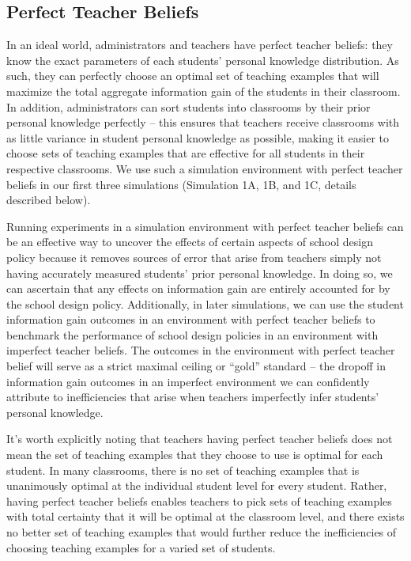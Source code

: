\documentclass[10pt, letterpaper]{apa6}
\begin{document}
\subsection{Perfect Teacher Beliefs}\label{perfect-teacher-beliefs}

In an ideal world, administrators and teachers have perfect teacher
beliefs: they know the exact parameters of each students' personal
knowledge distribution. As such, they can perfectly choose an optimal
set of teaching examples that will maximize the total aggregate
information gain of the students in their classroom. In addition,
administrators can sort students into classrooms by their prior personal
knowledge perfectly -- this ensures that teachers receive classrooms
with as little variance in student personal knowledge as possible,
making it easier to choose sets of teaching examples that are effective
for all students in their respective classrooms. We use such a
simulation environment with perfect teacher beliefs in our first three
simulations (Simulation 1A, 1B, and 1C, details described below).

Running experiments in a simulation environment with perfect teacher
beliefs can be an effective way to uncover the effects of certain
aspects of school design policy because it removes sources of error that
arise from teachers simply not having accurately measured students'
prior personal knowledge. In doing so, we can ascertain that any effects
on information gain are entirely accounted for by the school design
policy. Additionally, in later simulations, we can use the student
information gain outcomes in an environment with perfect teacher beliefs
to benchmark the performance of school design policies in an environment
with imperfect teacher beliefs. The outcomes in the environment with
perfect teacher belief will serve as a strict maximal ceiling or
``gold'' standard -- the dropoff in information gain outcomes in an
imperfect environment we can confidently attribute to inefficiencies
that arise when teachers imperfectly infer students' personal knowledge.

It's worth explicitly noting that teachers having perfect teacher
beliefs does not mean the set of teaching examples that they choose to
use is optimal for each student. In many classrooms, there is no set of
teaching examples that is unanimously optimal at the individual student
level for every student. Rather, having perfect teacher beliefs enables
teachers to pick sets of teaching examples with total certainty that it
will be optimal at the classroom level, and there exists no better set
of teaching examples that would further reduce the inefficiencies of
choosing teaching examples for a varied set of students.
\end{document}
